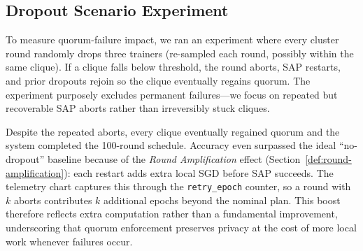 \subsection{Dropout Scenario Experiment}
\label{sec:dropout-scenario}

To measure quorum-failure impact, we ran an experiment where every cluster round randomly drops three trainers (re-sampled each round, possibly within the same clique). If a clique falls below threshold, the round aborts, SAP restarts, and prior dropouts rejoin so the clique eventually regains quorum. The experiment purposely excludes permanent failures—we focus on repeated but recoverable SAP aborts rather than irreversibly stuck cliques.

Despite the repeated aborts, every clique eventually regained quorum and the system completed the 100-round schedule. Accuracy even surpassed the ideal ``no-dropout'' baseline because of the \emph{Round Amplification} effect (Section~\ref{def:round-amplification}): each restart adds extra local SGD before SAP succeeds. The telemetry chart captures this through the \texttt{retry\_epoch} counter, so a round with $k$ aborts contributes $k$ additional epochs beyond the nominal plan. This boost therefore reflects extra computation rather than a fundamental improvement, underscoring that quorum enforcement preserves privacy at the cost of more local work whenever failures occur.
